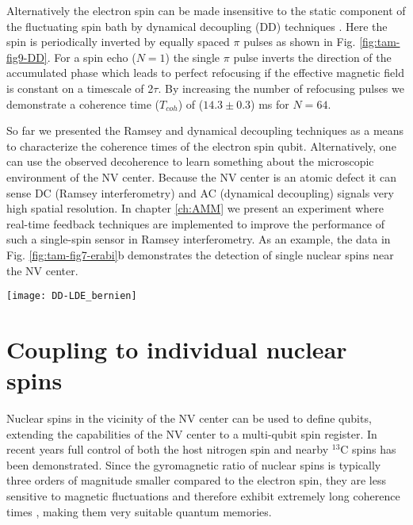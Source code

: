 Alternatively the electron spin can be made insensitive to the static component of the fluctuating spin bath by dynamical decoupling (DD) techniques \cite{Lange_Science_2010,Ryan_Phys.Rev.Lett._2010}. Here the spin is periodically inverted by equally spaced $\pi$ pulses as shown in Fig. \ref{fig:tam-fig9-DD}. For a spin echo ($N = 1$) the single $\pi$ pulse inverts the direction of the accumulated phase which leads to perfect refocusing if the effective magnetic field is constant on a timescale of 2$\tau$. By increasing the number of refocusing pulses we demonstrate a coherence time ($T_{coh}$) of ($14.3 \pm 0.3$) ms for $N = 64$.

So far we presented the Ramsey and dynamical decoupling techniques as a means to characterize the coherence times of the electron spin qubit. Alternatively, one can use the observed decoherence to learn something about the microscopic environment of the NV center. Because the NV center is an atomic defect it can sense DC (Ramsey interferometry) and AC (dynamical decoupling) signals very high spatial resolution. In chapter \ref{ch:AMM} we present an experiment where real-time feedback techniques are implemented to improve the performance of such a single-spin sensor in Ramsey interferometry. As an example, the data in Fig. \ref{fig:tam-fig7-erabi}b demonstrates the detection of single nuclear spins near the NV center.

\begin{figure*}
	\centering
	\texttt{[image: DD-LDE\_bernien]}
	\caption{\label{fig:tam-fig9-DD} \textbf{Dynamical Decoupling of the electron spin} The coherence of the electron spin as a function of the total free evolution time $t_{FE} = 2 \tau N$ during an $N$-pulse dynamical decoupling sequence\cite{Lange_Science_2010}. The solid lines are a fit to the function $A e^{(-\frac{t{FE}}{T_{coh}})^3} + 0.5$. For $N = 64$ we find $T_{coh} = $($14.3 \pm 0.3$) ms. }
\end{figure*}

\section{Coupling to individual nuclear spins}
Nuclear spins in the vicinity of the NV center can be used to define qubits, extending the capabilities of the NV center to a multi-qubit spin register. In recent years full control of both the host nitrogen spin \cite{Gaebel_NatPhys_2006,Hanson_Phys.Rev.Lett._2006,Neumann_Science_2010,Fuchs_NatPhys_2011,vanderSar_Nature_2012} and nearby $^{13}$C spins \cite{Jelezko_Phys.Rev.Lett._2004,Dutt_Science_2007,Neumann_Science_2008,Jiang_Science_2009,Smeltzer_Phys.Rev.A_2009,Taminiau_Phys.Rev.Lett._2012} has been demonstrated. Since the gyromagnetic ratio of nuclear spins is typically three orders of magnitude smaller compared to the electron spin, they are less sensitive to magnetic fluctuations and therefore exhibit extremely long coherence times \cite{Maurer_Science_2012}, making them very suitable quantum memories.

